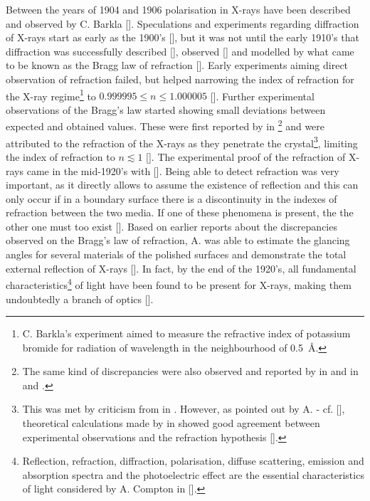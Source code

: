\begin{refsection}
Between the years of 1904 and 1906 polarisation in X-rays have been described and observed by C. Barkla [\cite{Barkla1904, Barkla1905, Barkla1906}]. Speculations and experiments regarding diffraction of X-rays start as early as the 1900's [\cite{Haga1903,Walter1908,Walter1909}], but it was not until the early 1910's that diffraction was successfully described [\cite{Laue1912}], observed [\cite{FriedrichKnippingLaue1912}] and modelled by what came to be known as the Bragg law of refraction [\cite{BraggW.H.1913}]. Early experiments aiming direct observation of refraction failed, but helped narrowing the index of refraction for the X-ray regime\footnote{C. Barkla's experiment aimed to measure the refractive index of potassium bromide for radiation of wavelength in the neighbourhood of 0.5~\r{A}.} to $0.999995\leq n \leq1.000005$ [\cite{Barkla1916}]. Further experimental observations of the Bragg's law started showing small deviations between expected and obtained values. These were first reported by \citeauthor{Stenstrom1919} in \cite*{Stenstrom1919}\footnote{The same kind of discrepancies were also observed and reported by \citeauthor{Duane1920} in \cite*{Duane1920} and \citeauthor{Siegbahn1920} in \cite*{Siegbahn1920} and \cite*{Siegbahn1921}.} and were attributed to the refraction of the X-rays as they penetrate the crystal\footnote{This was met by criticism from \citeauthor{Knipping1920} in \cite*{Knipping1920} \citep{Knipping1920}. However, as pointed out by A. \citeauthor{Compton1923} - cf. [\cite{Compton1923}], theoretical calculations made by \citeauthor{Ewald1920} in \cite*{Ewald1920} showed good agreement between experimental observations and the refraction hypothesis [\cite{Ewald1920}].}, limiting the index of refraction to $n\lesssim1$ [\cite[\textit{§3}]{Stenstrom1919}]. The experimental proof of the refraction of X-rays came in the mid-1920's with [\cite{Larsson1924}]. Being able to detect refraction was very important, as it directly allows to assume the existence of reflection and this can only occur if in a boundary surface there is a discontinuity in the indexes of refraction between the two media. If one of these phenomena is present, the the other one must too exist [\cite{Compton1928}]. Based on earlier reports about the discrepancies observed on the Bragg's law of refraction, A. \citeauthor{Compton1923} was able to estimate the glancing angles for several materials of the polished surfaces and demonstrate the total external reflection of X-rays [\cite{Compton1923,Prins1927}]. In fact, by the end of the 1920's, all fundamental characteristics\footnote{Reflection, refraction, diffraction, polarisation, diffuse scattering, emission and absorption spectra and the photoelectric effect are the essential characteristics of light considered by A. Compton in [\cite{Compton1928}].} of light have been found to be present for X-rays, making them undoubtedly a branch of optics [\cite{Compton1928}].  


\end{refsection}
